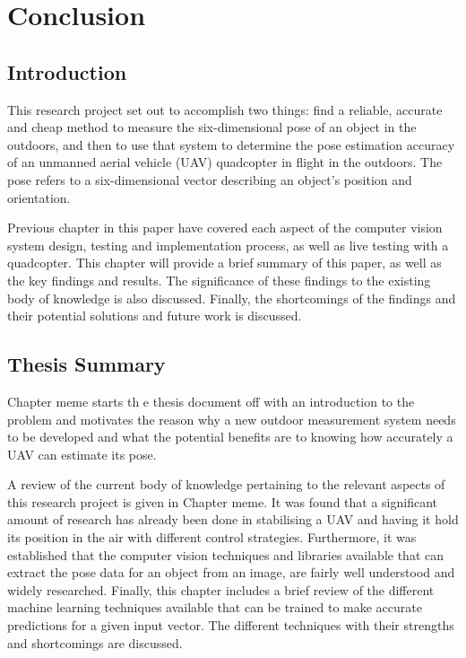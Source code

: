 \chapter{Conclusion}
\label{chap6}

\section{Introduction}

This research project set out to accomplish two things: find a reliable, accurate and cheap method to measure the six-dimensional pose of an object in the outdoors, and then to use that system to determine the pose estimation accuracy of an unmanned aerial vehicle (UAV) quadcopter in flight in the outdoors. The pose refers to a six-dimensional vector describing an object's position and orientation. 

Previous chapter in this paper have covered each aspect of the computer vision system design, testing and implementation process, as well as live testing with a quadcopter. This chapter will provide a brief summary of this paper, as well as the key findings and results. The significance of these findings to the existing body of knowledge is also discussed. Finally, the shortcomings of the findings and their potential solutions and future work is discussed. 

\section{Thesis Summary}

Chapter meme starts th e thesis document off with an introduction to the problem and motivates the reason why a new outdoor measurement system needs to be developed and what the potential benefits are to knowing how accurately a UAV can estimate its pose.  

A review of the current body of knowledge pertaining to the relevant aspects of this research project is given in Chapter meme. It was found that a significant amount of research has already been done in stabilising a UAV and having it hold its position in the air with different control strategies. Furthermore, it was established that the computer vision techniques and libraries available that can extract the pose data for an object from an image, are fairly well understood and widely researched. Finally, this chapter includes a brief review of the different machine learning techniques available that can be trained to make accurate predictions for a given input vector. The different techniques with their strengths and shortcomings are discussed.  


